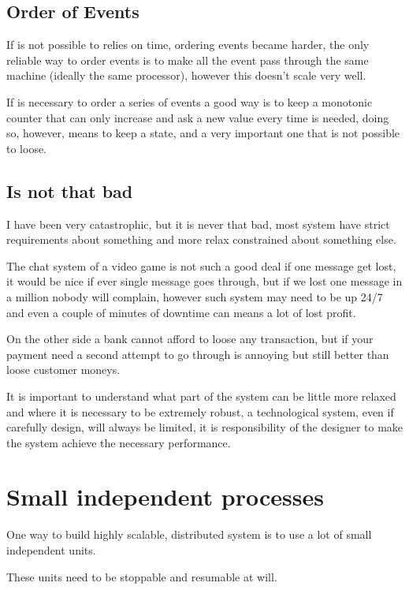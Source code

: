 \documentclass[12pt]{article} %
\begin{document}
	\subsection{Order of Events}
	
If is not possible to relies on time, ordering events became harder, the only reliable way to order events is to make all the event pass through the same machine (ideally the same processor), however this doesn't scale very well.

If is necessary to order a series of events a good way is to keep a monotonic counter that can only increase and ask a new value every time is needed, doing so, however, means to keep a state, and a very important one that is not possible to loose.

	\subsection{Is not that bad}

I have been very catastrophic, but it is never that bad, most system have strict requirements about something and more relax constrained about something else. 

The chat system of a video game is not such a good deal if one message get lost, it would be nice if ever single message goes through, but if we lost one message in a million nobody will complain, however such system may need to be up 24/7 and even a couple of minutes of downtime can means a lot of lost profit.

On the other side a bank cannot afford to loose any transaction, but if your payment need a second attempt to go through is annoying but still better than loose customer moneys.

It is important to understand what part of the system can be little more relaxed and where it is necessary to be extremely robust, a technological system, even if carefully design, will always be limited, it is responsibility of the designer to make the system achieve the necessary performance.

\section{Small independent processes}

One way to build highly scalable, distributed system is to use a lot of small independent units.

These units need to be stoppable and resumable at will.
\end{document}
